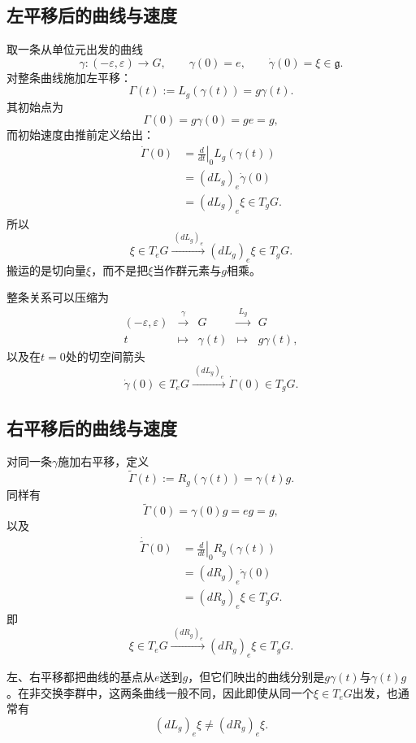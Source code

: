 \subsection{左平移后的曲线与速度}

取一条从单位元出发的曲线
\[
    \gamma:(-\varepsilon,\varepsilon)\to G,
    \qquad
    \gamma(0)=e,
    \qquad
    \dot\gamma(0)=\xi\in\mathfrak g.
\]
对整条曲线施加左平移：
\[
    \Gamma(t)
    :=L_g(\gamma(t))
    =g\gamma(t).
\]
其初始点为
\[
    \Gamma(0)=g\gamma(0)=ge=g,
\]
而初始速度由推前定义给出：
\[
\begin{aligned}
    \dot\Gamma(0)
    &=\left.\frac{d}{dt}\right|_0L_g(\gamma(t))\\
    &=(dL_g)_e\dot\gamma(0)\\
    &=(dL_g)_e\xi\in T_gG.
\end{aligned}
\]
所以
\[
    \boxed{
    \xi\in T_eG
    \xrightarrow{\ (dL_g)_e\ }
    (dL_g)_e\xi\in T_gG.
    }
\]
搬运的是切向量$\xi$，而不是把$\xi$当作群元素与$g$相乘。

整条关系可以压缩为
\[
\begin{array}{ccccc}
(-\varepsilon,\varepsilon)
&\xrightarrow{\ \gamma\ }&
G
&\xrightarrow{\ L_g\ }&
G\\
t&\longmapsto&\gamma(t)&\longmapsto&g\gamma(t),
\end{array}
\]
以及在$t=0$处的切空间箭头
\[
    \dot\gamma(0)\in T_eG
    \xrightarrow{\ (dL_g)_e\ }
    \dot\Gamma(0)\in T_gG.
\]

\subsection{右平移后的曲线与速度}

对同一条$\gamma$施加右平移，定义
\[
    \widetilde\Gamma(t)
    :=R_g(\gamma(t))
    =\gamma(t)g.
\]
同样有
\[
    \widetilde\Gamma(0)=\gamma(0)g=eg=g,
\]
以及
\[
\begin{aligned}
    \dot{\widetilde\Gamma}(0)
    &=\left.\frac{d}{dt}\right|_0R_g(\gamma(t))\\
    &=(dR_g)_e\dot\gamma(0)\\
    &=(dR_g)_e\xi\in T_gG.
\end{aligned}
\]
即
\[
    \boxed{
    \xi\in T_eG
    \xrightarrow{\ (dR_g)_e\ }
    (dR_g)_e\xi\in T_gG.
    }
\]

左、右平移都把曲线的基点从$e$送到$g$，但它们映出的曲线分别是$g\gamma(t)$与$\gamma(t)g$。在非交换李群中，这两条曲线一般不同，因此即使从同一个$\xi\in T_eG$出发，也通常有
\[
    (dL_g)_e\xi
    \neq
    (dR_g)_e\xi.
\]

